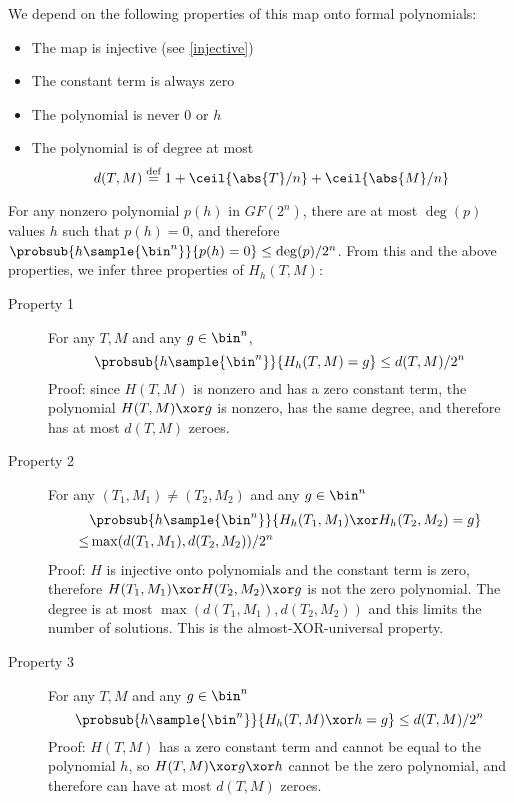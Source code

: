 \documentclass[hctr.tex]{subfiles}
\begin{document}
We depend on the following properties of this map 
onto formal polynomials:
\begin{itemize}
    \item The map is injective (see \autoref{injective})
    \item The constant term is always zero
    \item The polynomial is never \(0\) or \(h\)
    \item The polynomial is of degree at most
    \begin{displaymath}
        d(T, M) \defeq 1 + \ceil{\abs{T}/n} + \ceil{\abs{M}/n}
    \end{displaymath}
\end{itemize}

For any nonzero polynomial \(p(h)\)
in \(GF(2^n)\), there are at most \(\deg(p)\) values \(h\)
such that \(p(h) = 0\), and therefore
\(\probsub{h\sample{\bin^n}}{p(h) = 0} \leq \deg(p)/2^n\).
From this and the above properties,
we infer three properties of \(H_h(T, M)\):
\begin{description}
    \item[Property 1]
    For any \(T, M\) and any \(g \in \bin^n\),
    \begin{displaymath}
        \probsub{h\sample{\bin^n}}{H_h(T, M) = g} \leq d(T, M)/2^n
    \end{displaymath}
    Proof: since \(H(T, M)\) is nonzero and has
    a zero constant term,
    the polynomial \(H(T, M) \xor g\) 
    is nonzero,
    has the same degree,
    and therefore has at most \(d(T, M)\) zeroes.
    \item[Property 2] 
    For any \((T_1, M_1) \neq (T_2, M_2)\) and any \(g \in \bin^n\)
    \begin{align*}
        & \probsub{h\sample{\bin^n}}{H_h(T_1, M_1) \xor H_h(T_2, M_2) = g} \\
        \leq  & \max(d(T_1, M_1), d(T_2, M_2))/2^n
    \end{align*}
    Proof: \(H\) is injective onto polynomials
    and the constant term is zero, therefore
    \(H(T_1, M_1) \xor H(T_2, M_2) \xor g\)
    is not the zero polynomial.
    The degree is at most \(\max(d(T_1, M_1), d(T_2, M_2))\)
    and this limits the number of solutions.
    This is the almost-XOR-universal property.
    \item[Property 3]
    For any \(T, M\) and any \(g \in \bin^n\)
    \begin{displaymath}
        \probsub{h\sample{\bin^n}}{H_h(T, M) \xor h = g} \leq d(T, M)/2^n
    \end{displaymath}
    Proof: \(H(T, M)\) has a zero constant term and
    cannot be equal to the polynomial \(h\),
    so \(H(T, M) \xor g \xor h\) cannot be the zero polynomial, and
    therefore can have at most \(d(T, M)\) zeroes.
\end{description}
\end{document}
